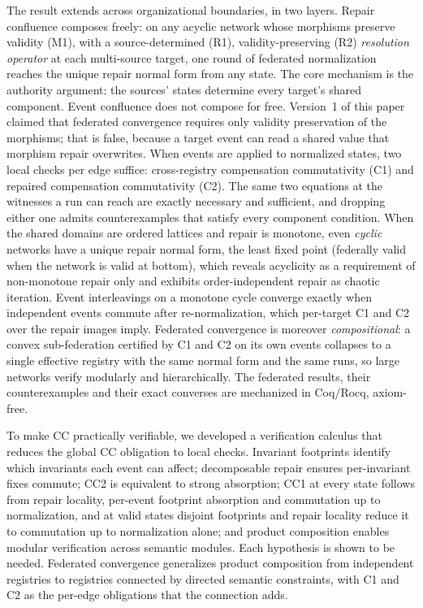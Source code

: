 \documentclass[11pt,a4paper]{article}
\theoremstyle{plain}
\theoremstyle{definition}
\theoremstyle{remark}
\renewcommand{\_}{\textunderscore\allowbreak}
\begin{document}
The result extends across organizational boundaries, in two layers.  Repair
confluence composes freely: on any acyclic network whose morphisms preserve
validity (M1), with a source-determined (R1), validity-preserving (R2)
\emph{resolution operator} at each multi-source target, one round of federated
normalization reaches the unique repair normal form from any state.  The core
mechanism is the authority argument: the sources' states determine every
target's shared component.  Event confluence does not compose for free.
Version~1 of this paper claimed that federated convergence requires only
validity preservation of the morphisms; that is false, because a target event
can read a shared value that morphism repair overwrites.  When events are
applied to normalized states, two local checks per edge suffice:
cross-registry compensation commutativity (C1) and repaired compensation
commutativity (C2).  The same two equations at the witnesses a run can reach
are exactly necessary and sufficient, and dropping either one admits
counterexamples that satisfy every component condition.  When the shared
domains are ordered lattices and repair is monotone, even \emph{cyclic}
networks have a unique repair normal form, the least fixed point (federally
valid when the network is valid at bottom), which reveals acyclicity as a
requirement of non-monotone repair only and exhibits order-independent repair as
chaotic iteration.  Event interleavings on a monotone cycle converge exactly when
independent events commute after re-normalization, which per-target C1 and C2
over the repair images imply.  Federated convergence is moreover
\emph{compositional}: a convex sub-federation certified by C1 and C2 on its
own events collapses to a single effective registry with the same normal form
and the same runs, so large networks verify modularly and hierarchically.  The
federated results, their counterexamples and their exact converses are
mechanized in Coq/Rocq, axiom-free.

To make CC practically verifiable, we developed a verification calculus that
reduces the global CC obligation to local checks.  Invariant footprints
identify which invariants each event can affect; decomposable repair ensures
per-invariant fixes commute; CC2 is equivalent to strong absorption; CC1 at
every state follows from repair locality, per-event footprint absorption and
commutation up to normalization, and at valid states disjoint footprints and
repair locality reduce it to commutation up to normalization alone; and
product composition enables modular verification across semantic modules.
Each hypothesis is shown to be needed.  Federated convergence generalizes product composition from
independent registries to registries connected by directed semantic
constraints, with C1 and C2 as the per-edge obligations that the connection
adds.
\end{document}
